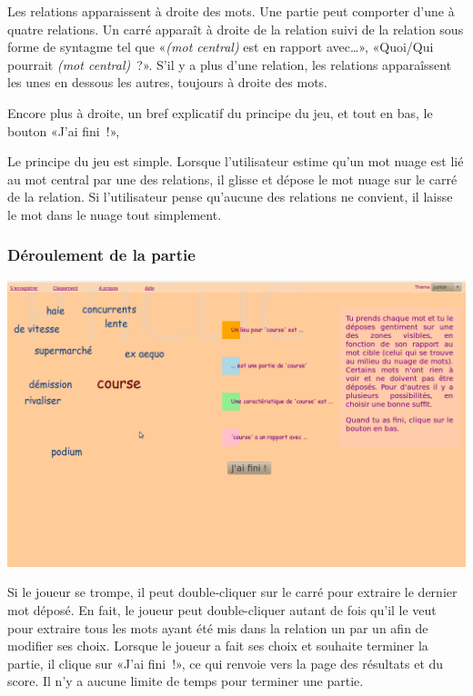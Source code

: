 \documentclass[a4paper,11pt,french]{article}
\begin{document}
Les relations apparaissent à droite des mots. Une partie peut comporter d'une à quatre relations. Un carré apparaît à droite de la relation suivi de la relation sous forme de syntagme tel que «\emph{(mot central)} est en rapport avec\dots{}», «Quoi/Qui pourrait \emph{(mot central)}~?». S'il y a plus d'une relation, les relations apparaîssent les unes en dessous les autres, toujours à droite des mots.

Encore plus à droite, un bref explicatif du principe du jeu, et tout en bas, le bouton «J'ai fini~!», 

Le principe du jeu est simple. Lorsque l'utilisateur estime qu'un mot nuage est lié au mot central par une des relations, il glisse et dépose le mot nuage sur le carré de la relation. Si l'utilisateur pense qu'aucune des relations ne convient, il laisse le mot dans le nuage tout simplement. 

\subsubsection{Déroulement de la partie}
\begin{center}
\includegraphics[width=14cm]{img/PtiClicJeu2.png}
\end{center}

Si le joueur se trompe, il peut double-cliquer sur le carré pour extraire le dernier mot déposé. En fait, le joueur peut double-cliquer
autant de fois qu'il le veut pour extraire tous les mots ayant été mis dans la relation un par un afin de modifier ses choix. Lorsque le
joueur a fait ses choix et souhaite terminer la partie, il clique sur «J'ai fini~!», ce qui renvoie vers la page des résultats et du score. Il
n'y a aucune limite de temps pour terminer une partie.
\end{document}
